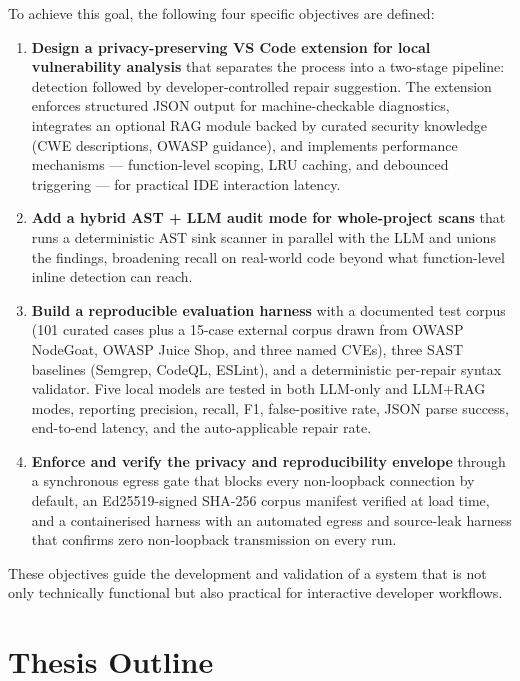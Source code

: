 To achieve this goal, the following four specific objectives are defined:

\begin{enumerate}
  \item \textbf{Design a privacy-preserving VS Code extension for local vulnerability analysis} that separates the process into a two-stage pipeline: detection followed by developer-controlled repair suggestion. The extension enforces structured JSON output for machine-checkable diagnostics, integrates an optional RAG module backed by curated security knowledge (CWE descriptions, OWASP guidance), and implements performance mechanisms --- function-level scoping, LRU caching, and debounced triggering --- for practical IDE interaction latency.

  \item \textbf{Add a hybrid AST + LLM audit mode for whole-project scans} that runs a deterministic AST sink scanner in parallel with the LLM and unions the findings, broadening recall on real-world code beyond what function-level inline detection can reach.

  \item \textbf{Build a reproducible evaluation harness} with a documented test corpus (101 curated cases plus a 15-case external corpus drawn from OWASP NodeGoat, OWASP Juice Shop, and three named CVEs), three SAST baselines (Semgrep, CodeQL, ESLint), and a deterministic per-repair syntax validator. Five local models are tested in both LLM-only and LLM+RAG modes, reporting precision, recall, F1, false-positive rate, JSON parse success, end-to-end latency, and the auto-applicable repair rate.

  \item \textbf{Enforce and verify the privacy and reproducibility envelope} through a synchronous egress gate that blocks every non-loopback connection by default, an Ed25519-signed SHA-256 corpus manifest verified at load time, and a containerised harness with an automated egress and source-leak harness that confirms zero non-loopback transmission on every run.
\end{enumerate}

These objectives guide the development and validation of a system that is not only technically functional but also practical for interactive developer workflows.

\section{Thesis Outline}
\label{sec:intro-structure}

